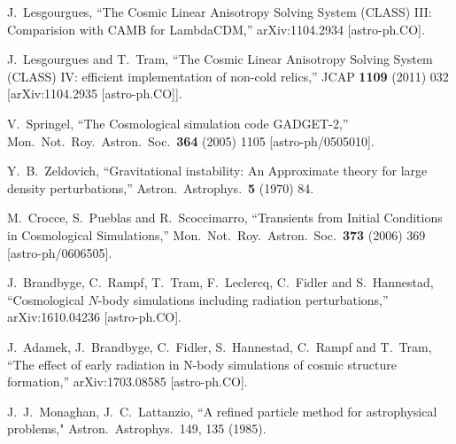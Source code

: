 \documentclass[11pt,a4paper]{article}
\renewcommand\({\left(}
\renewcommand\){\right)}
\renewcommand\[{\left[}
\renewcommand\]{\right]}
\begin{document}
\begin{thebibliography}{10}
  J.~Lesgourgues,
  ``The Cosmic Linear Anisotropy Solving System (CLASS) III: Comparision with CAMB for LambdaCDM,''
  arXiv:1104.2934 [astro-ph.CO].

  J.~Lesgourgues and T.~Tram,
  ``The Cosmic Linear Anisotropy Solving System (CLASS) IV: efficient implementation of non-cold relics,''
  JCAP {\bf 1109} (2011) 032
  [arXiv:1104.2935 [astro-ph.CO]].


  V.~Springel,
  ``The Cosmological simulation code GADGET-2,''
  Mon.\ Not.\ Roy.\ Astron.\ Soc.\  {\bf 364} (2005) 1105
  [astro-ph/0505010].

  Y.~B.~Zeldovich,
  ``Gravitational instability: An Approximate theory for large density perturbations,''
  Astron.\ Astrophys.\  {\bf 5} (1970) 84.
  
  M.~Crocce, S.~Pueblas and R.~Scoccimarro,
  ``Transients from Initial Conditions in Cosmological Simulations,''
  Mon.\ Not.\ Roy.\ Astron.\ Soc.\  {\bf 373} (2006) 369
  [astro-ph/0606505].
  
  J.~Brandbyge, C.~Rampf, T.~Tram, F.~Leclercq, C.~Fidler and S.~Hannestad,
  ``Cosmological $N$-body simulations including radiation perturbations,''
  arXiv:1610.04236 [astro-ph.CO].

  J.~Adamek, J.~Brandbyge, C.~Fidler, S.~Hannestad, C.~Rampf and T.~Tram,
  ``The effect of early radiation in N-body simulations of cosmic structure formation,''
  arXiv:1703.08585 [astro-ph.CO].
  
    J.~J.~Monaghan, J.~C.~Lattanzio, 
    ``A refined particle method for astrophysical problems,"
    Astron.\ Astrophys.\ 149, 135 (1985).  
  

\end{thebibliography}
\end{document}
